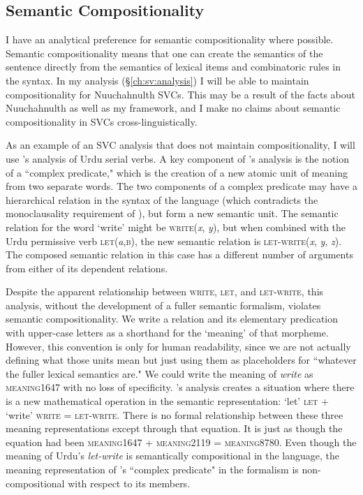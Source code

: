 \subsection{Semantic Compositionality} \label{ch:sv:def:compositionality}

I have an analytical preference for semantic compositionality where possible. Semantic compositionality means that one can create the semantics of the sentence directly from the semantics of lexical items and combinatoric rules in the syntax. In my analysis (\S\ref{ch:sv:analysis}) I will be able to maintain compositionality for Nuuchahnulth SVCs. This may be a result of the facts about Nuuchahnulth as well as my framework, and I make no claims about semantic compositionality in SVCs cross-linguistically.

As an example of an SVC analysis that does not maintain compositionality, I will use \cite{butt1995}'s analysis of Urdu serial verbs.  A key component of \citeauthor{butt1995}'s analysis is the notion of a ``complex predicate," which is the creation of a new atomic unit of meaning from two separate words. The two components of a complex predicate may have a hierarchical relation in the syntax of the language (which contradicts the monoclausality requirement of \cite{aikhenvalddixon2006}), but form a new semantic unit. The semantic relation for the word `write' might be \textsc{write}(\textit{x}, \textit{y}), but when combined with the Urdu permissive verb \textsc{let}(\textit{a},\textsc{b}), the new semantic relation is \textsc{let-write}(\textit{x}, \textit{y}, \textit{z}). The composed semantic relation in this case has a different number of arguments from either of its dependent relations.

Despite the apparent relationship between \textsc{write}, \textsc{let}, and \textsc{let-write}, this analysis, without the development of a fuller semantic formalism, violates semantic compositionality. We write a relation and its elementary predication with upper-case letters as a shorthand for the `meaning' of that morpheme. However, this convention is only for human readability, since we are not actually defining what those units mean but just using them as placeholders for ``whatever the fuller lexical semantics are." We could write the meaning of \textit{write} as \textsc{meaning1647} with no loss of specificity. \citeauthor{butt1995}'s analysis creates a situation where there is a new mathematical operation in the semantic representation: `let' \textsc{let} + `write' \textsc{write} = \textsc{let-write}. There is no formal relationship between these three meaning representations except through that equation. It is just as though the equation had been \textsc{meaning1647} + \textsc{meaning2119} = \textsc{meaning8780}. Even though the meaning of Urdu's \textit{let-write} is semantically compositional in the language, the meaning representation of \citeauthor{butt1995}'s ``complex predicate" in the formalism is non-compositional with respect to its members.

